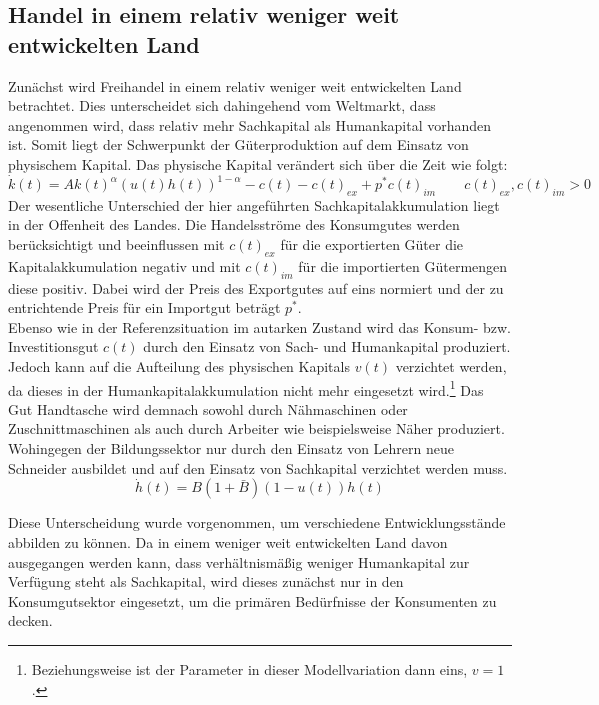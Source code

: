 \subsection{Handel in einem relativ weniger weit entwickelten Land}
Zunächst wird Freihandel in einem relativ weniger weit entwickelten Land betrachtet. Dies unterscheidet sich dahingehend vom Weltmarkt, dass angenommen wird, dass relativ mehr Sachkapital als Humankapital vorhanden ist. Somit liegt der Schwerpunkt der Güterproduktion auf dem Einsatz von physischem Kapital. Das physische Kapital verändert sich über die Zeit wie folgt: 
%
\begin{equation}
	\dot{k}(t)=Ak(t)^\alpha(u(t)h(t))^{1-\alpha}-c(t)-c(t)_{ex}+p^*c(t)_{im} \qquad{c(t)_{ex}, c(t)_{im}>0}
\end{equation}
%
Der wesentliche Unterschied der hier angeführten Sachkapitalakkumulation liegt in der Offenheit des Landes. Die Handelsströme des Konsumgutes werden berücksichtigt und beeinflussen mit $c(t)_{ex}$ für die exportierten Güter die Kapitalakkumulation negativ und mit $c(t)_{im}$ für die importierten Gütermengen diese positiv. Dabei wird der Preis des Exportgutes auf eins normiert und der zu entrichtende Preis für ein Importgut beträgt $p^*$.\\
%

Ebenso wie in der Referenzsituation im autarken Zustand wird das Konsum- bzw. Investitionsgut $c(t)$ durch den Einsatz von Sach- und Humankapital produziert. Jedoch kann auf die Aufteilung des physischen Kapitals $v(t)$ verzichtet werden, da dieses in der Humankapitalakkumulation nicht mehr eingesetzt wird.\footnote{Beziehungsweise ist der Parameter in dieser Modellvariation dann eins, $v=1$.} Das Gut Handtasche wird demnach sowohl durch Nähmaschinen oder Zuschnittmaschinen als auch durch Arbeiter wie beispielsweise Näher produziert. Wohingegen der Bildungssektor nur durch den Einsatz von Lehrern neue Schneider ausbildet und auf den Einsatz von Sachkapital verzichtet werden muss.
%
\begin{equation}
\dot{h}(t)=B(1+\bar{B})(1-u(t))h(t)
\end{equation}
%

Diese Unterscheidung wurde vorgenommen, um verschiedene Entwicklungsstände abbilden zu können. Da in einem weniger weit entwickelten Land davon ausgegangen werden kann, dass verhältnismäßig weniger Humankapital zur Verfügung steht als Sachkapital, wird dieses zunächst nur in den Konsumgutsektor eingesetzt, um die primären Bedürfnisse der Konsumenten zu decken.\\
%

